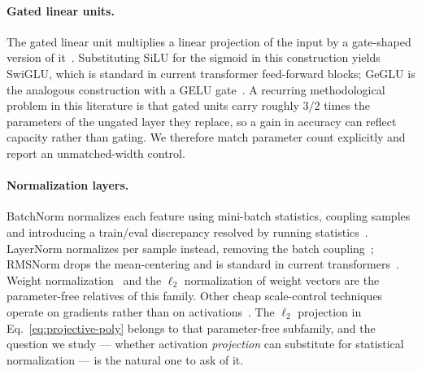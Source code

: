 \paragraph{Gated linear units.}
The gated linear unit multiplies a linear projection of the input by a
gate-shaped version of it~\citep{dauphin2017language}. Substituting SiLU for
the sigmoid in this
construction yields SwiGLU, which is standard in current transformer
feed-forward blocks; GeGLU is the analogous construction with a GELU
gate~\citep{shazeer2020glu}. A
recurring methodological problem in this literature is that gated units carry
roughly $3/2$ times the parameters of the ungated layer they replace, so a
gain in accuracy can reflect capacity rather than gating. We therefore match
parameter count explicitly and report an unmatched-width control.

\paragraph{Normalization layers.}
BatchNorm normalizes each feature using mini-batch statistics, coupling
samples and introducing a train/eval discrepancy resolved by running
statistics~\citep{ioffe2015batch,santurkar2018does,bjorck2018understanding}.
LayerNorm normalizes per sample instead, removing the
batch coupling~\citep{ba2016layer}; RMSNorm drops the mean-centering and is
standard in current
transformers~\citep{zhang2019root}. Weight normalization~\citep{salimans2016weight}
and the $\ell_2$ normalization of weight
vectors are the parameter-free relatives of this family. Other cheap
scale-control techniques operate on gradients rather than on
activations~\citep{meng2020gradient}. The $\ell_2$
projection in Eq.~\eqref{eq:projective-poly} belongs to that parameter-free
subfamily, and the question we study --- whether activation \emph{projection}
can substitute for statistical normalization --- is the natural one to ask of
it.

